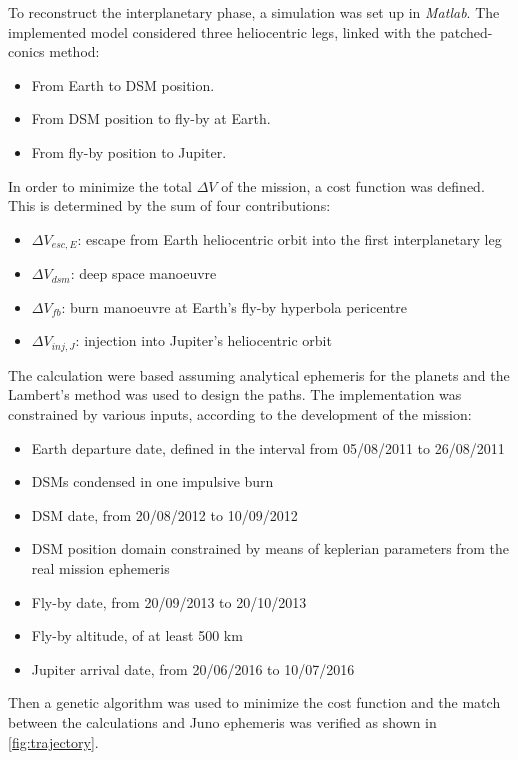 To reconstruct the interplanetary phase, a simulation was set up in \textit{Matlab}. The implemented model considered three heliocentric legs, linked with the patched-conics method:
\begin{itemize}
    \item From Earth to DSM position.
    \item From DSM position to fly-by at Earth.
    \item From fly-by position to Jupiter.
\end{itemize}
In order to minimize the total $\Delta V$ of the mission, a cost function was defined. This is determined by the sum of four contributions:
\begin{itemize}
    \item $\Delta V_{esc,E}$: escape from Earth heliocentric orbit into the first interplanetary leg
    \item $\Delta V_{dsm}$: deep space manoeuvre
    \item $\Delta V_{fb}$: burn manoeuvre at Earth's fly-by hyperbola pericentre
    \item $\Delta V_{inj,J}$: injection into Jupiter's heliocentric orbit
\end{itemize}
The calculation were based assuming analytical ephemeris for the planets and the Lambert's method was used to design the paths. The  implementation was constrained by various inputs, according to the development of the mission:
\begin{itemize}
    \item Earth departure date, defined in the interval from 05/08/2011 to 26/08/2011
    \item DSMs condensed in one impulsive burn
    \item DSM date, from 20/08/2012 to 10/09/2012
    \item DSM position domain constrained by means of keplerian parameters from the real mission ephemeris
    \item Fly-by date, from 20/09/2013 to 20/10/2013 
    \item Fly-by altitude, of at least 500 km
    \item Jupiter arrival date, from 20/06/2016 to 10/07/2016
\end{itemize}
Then a genetic algorithm was used to minimize the cost function and the match between the calculations and Juno ephemeris was verified as shown in \autoref{fig:trajectory}.

